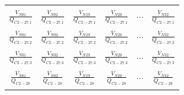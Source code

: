 \begin{enumerate}[\bfseries 4.3.1]
\begin{table}[H]
{\begin{tabular}{cccccc}
				&&&&&\\
				$\frac{V_{N01}}{Q_{C 2-27.1}}$& $\frac{V_{N02}}{Q_{C 2-27.1}}$& $\frac{V_{N19}}{Q_{C 2-27.1}}$& $\frac{V_{N20}}{Q_{C 2-27.1}}$&$ \cdots $&$\frac{V_{N32}}{Q_{C 2-27.1}}$\\
				&&&&&\\
				$\frac{V_{N01}}{Q_{C 2-27.2}}$& $\frac{V_{N02}}{Q_{C 2-27.2}}$& $\frac{V_{N19}}{Q_{C 2-27.2}}$& $\frac{V_{N20}}{Q_{C 2-27.2}}$&$ \cdots $&$\frac{V_{N32}}{Q_{C 2-27.2}}$\\
				&&&&&\\				
				$\frac{V_{N01}}{Q_{C 2-27.3}}$& $\frac{V_{N02}}{Q_{C 2-27.3}}$& $\frac{V_{N19}}{Q_{C 2-27.3}}$& $\frac{V_{N20}}{Q_{C 2-27.3}}$&$ \cdots$&$\frac{V_{N32}}{Q_{C 2-27.3}}$\\
				&&&&&\\
				$\frac{V_{N01}}{Q_{C 2-28}}$& $\frac{V_{N02}}{Q_{C 2-28}}$& $\frac{V_{N19}}{Q_{C 2-28}}$& $\frac{V_{N20}}{Q_{C 2-28}}$&$\cdots$&$\frac{V_{N32}}{Q_{C 2-28}}$\\
				&&&&&\\

\end{tabular}}
\end{table}
\end{enumerate}
